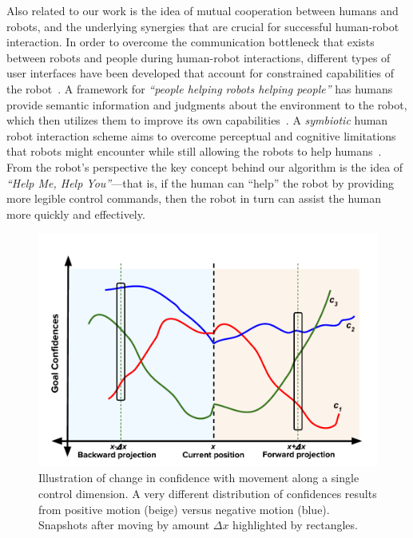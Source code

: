 \documentclass[conference]{IEEEtran}
\begin{document}
Also related to our work is the idea of mutual cooperation between humans and robots, and the underlying synergies that are crucial for successful human-robot interaction. In order to overcome the communication bottleneck that exists between robots and people during human-robot interactions, different types of user interfaces have been developed that account for constrained capabilities of the robot~\cite{goodfellow2010help}. A framework for \textit{``people helping robots helping people''} has humans provide semantic information and judgments about the environment to the robot, which then utilizes them to improve its own capabilities~\cite{sorokin2010people}. A \textit{symbiotic} human robot interaction scheme aims to overcome perceptual and cognitive limitations that robots might encounter while still allowing the robots to help humans~\cite{rosenthal2010effective}. From the robot's perspective the key concept behind our algorithm is the idea of \textit{``Help Me, Help You''}---that is, if the human can ``help'' the robot by providing more legible control commands, then the robot in turn can assist the human more quickly and effectively.

\begin{figure}
	\includegraphics[width = 1\hsize, height = 0.26\vsize]{./figures/DisambMetric.pdf}
	\vspace{-0.4cm}
	\caption{Illustration of change in confidence with movement along a single control dimension. A very different distribution of confidences results from positive motion (beige) versus negative motion (blue). Snapshots after moving by amount $\Delta x$ highlighted by rectangles.}
	\label{DM_FIG}
\end{figure}
\end{document}
